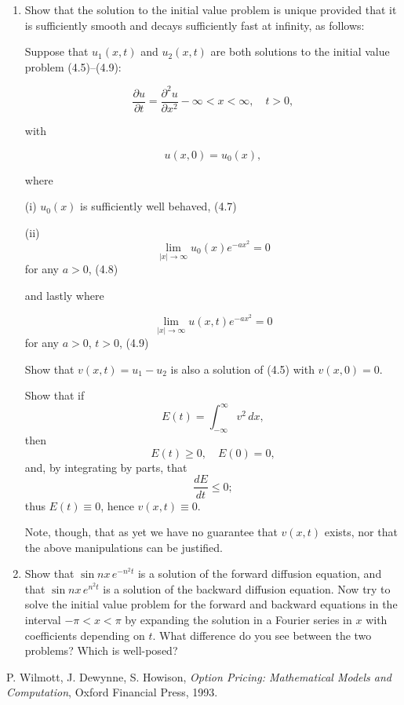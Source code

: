 \documentclass[12pt]{article}
\begin{document}
\begin{enumerate}
    \item Show that the solution to the initial value problem is unique 
provided that it is sufficiently smooth and decays sufficiently 
fast at infinity, as follows:

Suppose that $u_1(x, t)$ and $u_2(x, t)$ are both solutions to the 
initial value problem (4.5)--(4.9): 

\[\frac{\partial u}{\partial t} = \frac{\partial^2 u}{\partial x^2} - \infty < x < \infty, \quad t > 0, \tag{4.5}\]

with

\[u(x, 0) = u_0(x), \tag{4.6}\]

where

(i) \( u_0(x) \) is sufficiently well behaved, \hspace{20pt} (4.7)

(ii) \[ \lim_{|x|\to\infty} u_0(x)e^{-ax^2} = 0 \] for any \( a > 0 \), \hspace{20pt} (4.8)

and lastly where

\[ \lim_{|x|\to\infty} u(x,t)e^{-ax^2} = 0 \] for any \( a > 0 \), \( t > 0 \), \hspace{20pt} (4.9)

Show that $v(x, t) = u_1 - u_2$ 
is also a solution of (4.5) with $v(x, 0) = 0$. 

Show that if
\[
E(t) = \int_{-\infty}^\infty v^2 \, dx,
\]
then
\[
E(t) \geq 0, \quad E(0) = 0,
\]
and, by integrating by parts, that
\[
\frac{dE}{dt} \leq 0;
\]
thus $E(t) \equiv 0$, hence $v(x, t) \equiv 0$.

Note, though, that as yet we have no guarantee that $v(x, t)$ exists, 
nor that the above manipulations can be justified.

\item Show that \(\sin nx \, e^{-n^2t}\) is a solution of the forward diffusion equation, and that \(\sin nx \, e^{n^2t}\) is a solution of the backward diffusion equation. Now try to solve the initial value problem for the forward and backward equations in the interval \(-\pi < x < \pi\) by expanding the solution in a Fourier series in \(x\) with coefficients depending on \(t\). What difference do you see between the two problems? Which is well-posed?


\end{enumerate}

\begin{thebibliography}{9}

P. Wilmott, J. Dewynne, S. Howison,
\textit{Option Pricing: Mathematical Models and Computation},
Oxford Financial Press, 1993.

\end{thebibliography}
\end{document}
